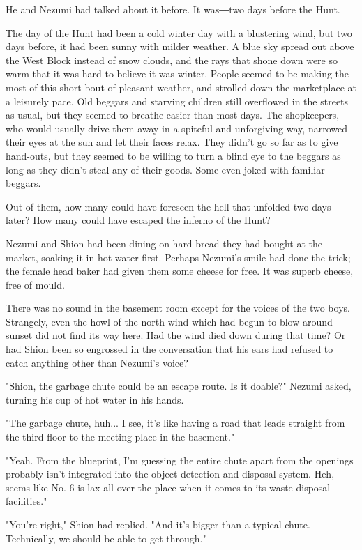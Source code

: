He and Nezumi had talked about it before. It was―two days before the
Hunt.

The day of the Hunt had been a cold winter day with a blustering wind,
but two days before, it had been sunny with milder weather. A blue sky
spread out above the West Block instead of snow clouds, and the rays
that shone down were so warm that it was hard to believe it was winter.
People seemed to be making the most of this short bout of pleasant
weather, and strolled down the marketplace at a leisurely pace. Old
beggars and starving children still overflowed in the streets as usual,
but they seemed to breathe easier than most days. The shopkeepers, who
would usually drive them away in a spiteful and unforgiving way,
narrowed their eyes at the sun and let their faces relax. They didn't go
so far as to give hand-outs, but they seemed to be willing to turn a
blind eye to the beggars as long as they didn't steal any of their
goods. Some even joked with familiar beggars.

Out of them, how many could have foreseen the hell that unfolded two
days later? How many could have escaped the inferno of the Hunt?

Nezumi and Shion had been dining on hard bread they had bought at the
market, soaking it in hot water first. Perhaps Nezumi's smile had done
the trick; the female head baker had given them some cheese for free. It
was superb cheese, free of mould.

There was no sound in the basement room except for the voices of the two
boys. Strangely, even the howl of the north wind which had begun to blow
around sunset did not find its way here. Had the wind died down during
that time? Or had Shion been so engrossed in the conversation that his
ears had refused to catch anything other than Nezumi's voice?

"Shion, the garbage chute could be an escape route. Is it doable?"
Nezumi asked, turning his cup of hot water in his hands.

"The garbage chute, huh... I see, it's like having a road that leads
straight from the third floor to the meeting place in the basement."

"Yeah. From the blueprint, I'm guessing the entire chute apart from the
openings probably isn't integrated into the object-detection and
disposal system. Heh, seems like No. 6 is lax all over the place when it
comes to its waste disposal facilities."

"You're right," Shion had replied. "And it's bigger than a typical
chute. Technically, we should be able to get through."

